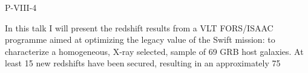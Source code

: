 P-VIII-4


\bigskip



\bigskip

\noindent In this talk I will present the redshift results from a VLT FORS/ISAAC programme aimed at optimizing the legacy value of the Swift mission: to characterize a homogeneous, X-ray selected, sample of 69 GRB host galaxies. At least 15 new redshifts have been secured, resulting in an approximately 75%

